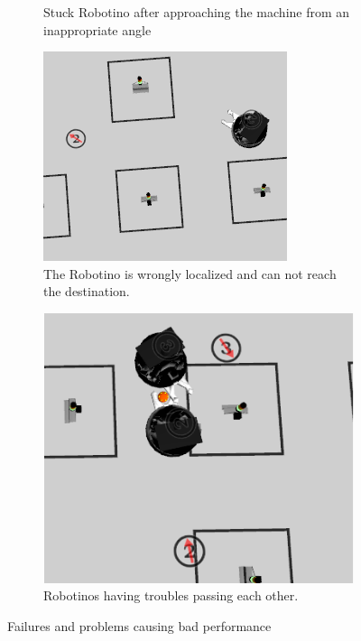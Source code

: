 \begin{figure}
\begin{subfigure}[b]{0.40\textwidth}
    \caption{Stuck Robotino after approaching the machine from an inappropriate angle}
    \label{fig:fails_angle}
  \end{subfigure}
  \begin{subfigure}[b]{0.40\textwidth}
    \includegraphics[width=\textwidth]{pics/p1_p2_wrong_localization_block_ins}
    \caption{The Robotino is wrongly localized and can not reach the destination.}
    \label{fig:fails_localization}
  \end{subfigure}
  \begin{subfigure}[b]{0.40\textwidth}
    \includegraphics[width=\textwidth]{pics/crash_p3_p3_wrong_localization}
    \caption{Robotinos having troubles passing each other.}
    \label{fig:fails_passing}
  \end{subfigure}
  \caption{Failures and problems causing bad performance}
  \label{fig:fails}
\end{figure}
